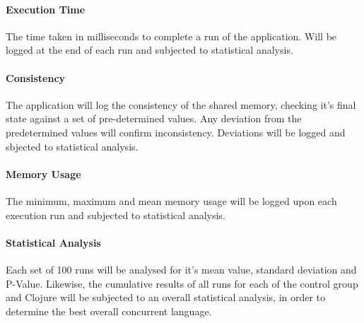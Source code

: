 \documentclass[12pt,a4paper]{article}
\begin{document}
\paragraph{Execution Time}
The time taken in milliseconds to complete a run of the application. Will be logged at the end of each run and subjected to statistical analysis.

\paragraph{Consistency}
The application will log the consistency of the shared memory, checking it's final state against a set of pre-determined values. Any deviation from the predetermined values will confirm inconsistency. Deviations will be logged and sbjected to statistical analysis.

\paragraph{Memory Usage}
The minimum, maximum and mean memory usage will be logged upon each execution run and subjected to statistical analysis.

\paragraph{Statistical Analysis}
Each set of 100 runs will be analysed for it's mean value, standard deviation and P-Value. Likewise, the cumulative results of all runs for each of the control group and Clojure will be subjected to an overall statistical analysis, in order to determine the best overall concurrent language.  

\newpage
\singlespacing
{}


\end{document}
